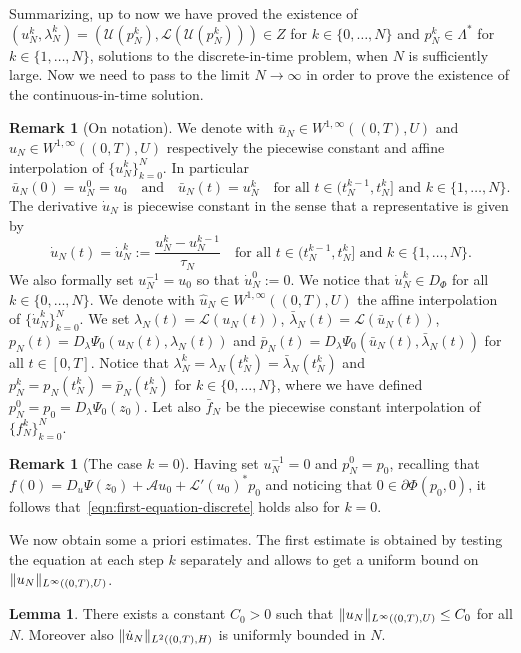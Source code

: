 \documentclass[a4paper,10pt,oneside]{amsbook}
\numberwithin{section}{chapter}
\numberwithin{equation}{chapter}
\theoremstyle{definition}
\newtheorem{lemma}[prop]{Lemma}
\newtheorem{rmk}[prop]{Remark}
\DeclarePairedDelimiter{\norm}{\lVert}{\rVert}
\begin{document}
Summarizing, up to now we have proved the existence of $(u_N^k,\lambda_N^k)=(\mathcal{U}(p_N^k),\mathcal{L}(\mathcal{U}(p_N^k)))\in Z$ for $k\in\{0,\dots,N\}$ and $p_N^k\in\Lambda^*$ for $k\in\{1,\dots,N\}$, solutions to the discrete-in-time problem, when $N$ is sufficiently large. Now we need to pass to the limit $N\to\infty$ in order to prove the existence of the continuous-in-time solution.
\begin{rmk}[On notation]
We denote with $\bar u_N\in W^{1,\infty}((0,T),U)$ and $u_N\in W^{1,\infty}((0,T),U)$ respectively the piecewise constant and affine interpolation of $\{u_N^k\}_{k=0}^N$. In particular
\[
\bar u_N(0)=u_N^0=u_0\quad\text{and}\quad\bar u_N(t)=u_N^k\quad\text{for all $t\in(t_N^{k-1},t_N^k]$ and $k\in\{1,\dots,N\}$}.
\] The derivative $\dot u_N$ is piecewise constant in the sense that a representative is given by
\[
\dot u_N(t)=\dot u_N^k:=\frac{u_N^k-u_N^{k-1}}{\tau_N}\quad\text{for all $t\in(t_N^{k-1},t_N^k]$ and $k\in\{1,\dots,N\}$}.
\]
We also formally set $u_N^{-1}=u_0$ so that $\dot u_N^0:=0$. We notice that $\dot u_N^k\in D_\Phi$ for all $k\in\{0,\dots,N\}$. We denote with $\hat u_N\in W^{1,\infty}((0,T),U)$ the affine interpolation of $\{\dot u_N^k\}_{k=0}^N$. We set $\lambda_N(t)=\mathcal{L}(u_N(t))$, $\bar\lambda_N(t)=\mathcal{L}(\bar u_N(t))$, $p_N(t)=D_\lambda\Psi_0(u_N(t),\lambda_N(t))$ and $\bar p_N(t)=D_\lambda\Psi_0(\bar u_N(t),\bar\lambda_N(t))$ for all $t\in[0,T]$. Notice that $\lambda_N^k=\lambda_N(t_N^k)=\bar\lambda_N(t_N^k)$ and $p_N^k=p_N(t_N^k)=\bar p_N(t_N^k)$ for $k\in\{0,\dots,N\}$, where we have defined $p_N^0=p_0=D_\lambda\Psi_0(z_0)$. Let also $\bar f_N$ be the piecewise constant interpolation of $\{f_N^k\}_{k=0}^N$.
\end{rmk}
\begin{rmk}[The case $k=0$]
Having set $u_N^{-1}=0$ and $p_N^0=p_0$, recalling that $f(0)=D_u\Psi(z_0)+\mathcal{A}u_0+\mathcal{L}'(u_0)^*p_0$ and noticing that $0\in\partial\Phi(p_0,0)$, it follows that~\eqref{eqn:first-equation-discrete} holds also for $k=0$.
\end{rmk}
We now obtain some a priori estimates. The first estimate is obtained by testing the equation at each step $k$ separately and allows to get a uniform bound on $\norm{u_N}_{L^\infty((0,T),U)}$.
\begin{lemma}
\label{lemma:a-priori-0}
There exists a constant $C_0>0$ such that $\norm{u_N}_{L^\infty((0,T),U)}\le C_0$ for all $N$. Moreover also $\norm{\dot u_N}_{L^2((0,T),H)}$ is uniformly bounded in $N$.
\end{lemma}
\end{document}
